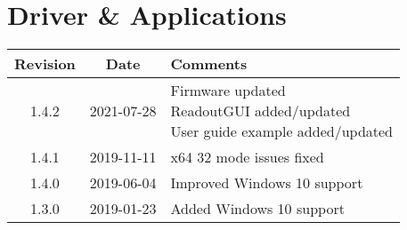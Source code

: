 \section{Driver \& Applications}
\begin{tabularx}{\textwidth}{|c|c|X|}
    \hline
    Revision & Date & Comments\\
    \hline\hline
    \hypertarget{drvrev}{1.4.2} & 2021-07-28 &
    \makecell[l]{
        Firmware updated \\*
        ReadoutGUI added/updated \\*
        User guide example added/updated \\*
    }\\
    \hline
    {1.4.1} & 2019-11-11 & x64 32 mode issues fixed\\
    \hline
    {1.4.0} & 2019-06-04 & Improved Windows 10 support\\
    \hline
    {1.3.0} & 2019-01-23 & Added Windows 10 support\\
    \hline
\end{tabularx}